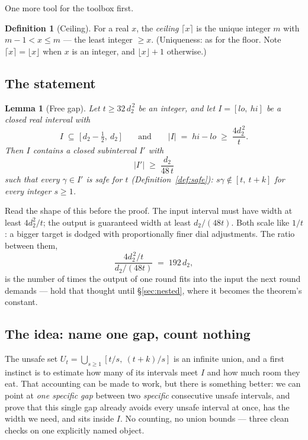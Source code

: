 \documentclass[11pt,reqno]{amsart}
\theoremstyle{plain}
\newtheorem{lemma}[theorem]{Lemma}
\theoremstyle{definition}
\newtheorem{definition}[theorem]{Definition}
\theoremstyle{remark}
\begin{document}
One more tool for the toolbox first.

\begin{definition}[Ceiling]\label{def:ceiling}
For a real $x$, the \emph{ceiling} $\lceil x \rceil$ is the unique integer $m$ with
$m - 1 < x \le m$ --- the least integer $\ge x$. (Uniqueness: as for the floor. Note
$\lceil x \rceil = \lfloor x \rfloor$ when $x$ is an integer, and
$\lfloor x \rfloor + 1$ otherwise.)
\end{definition}

\subsection{The statement}

\begin{lemma}[Free gap]\label{lem:freegap-friendly}
Let $t \ge 32\,d_2^{\,2}$ be an integer, and let $I = [lo,\ hi]$ be a closed real
interval with
\[
  I \;\subseteq\; \big[\, d_2 - \tfrac12,\ d_2 \,\big]
  \qquad\text{and}\qquad
  |I| \;=\; hi - lo \;\ge\; \frac{4 d_2^{\,2}}{t} .
\]
Then $I$ contains a closed subinterval $I'$ with
\[
  |I'| \;\ge\; \frac{d_2}{48\,t}
\]
such that \emph{every} $\gamma \in I'$ is safe for $t$ (Definition~\ref{def:safe}):
$s\gamma \notin [t,\ t+k]$ for every integer $s \ge 1$.
\end{lemma}

Read the shape of this before the proof. The input interval must have width at least
$4d_2^2/t$; the output is guaranteed width at least $d_2/(48t)$. Both scale like
$1/t$: a bigger target is dodged with proportionally finer dial adjustments. The
ratio between them,
\[
  \frac{4 d_2^{\,2}/t}{d_2/(48t)} \;=\; 192\, d_2 ,
\]
is the number of times the output of one round fits into the input the next round
demands --- hold that thought until \S\ref{sec:nested}, where it becomes the theorem's
constant.

\subsection{The idea: name one gap, count nothing}

The unsafe set $U_t = \bigcup_{s\ge1} [t/s,\ (t+k)/s]$ is an infinite union, and a
first instinct is to estimate how many of its intervals meet $I$ and how much room
they eat. That accounting can be made to work, but there is something better: we can
point at \emph{one specific gap} between two \emph{specific} consecutive unsafe
intervals, and prove that this single gap already avoids every unsafe interval at
once, has the width we need, and sits inside $I$. No counting, no union bounds ---
three clean checks on one explicitly named object.
\end{document}
